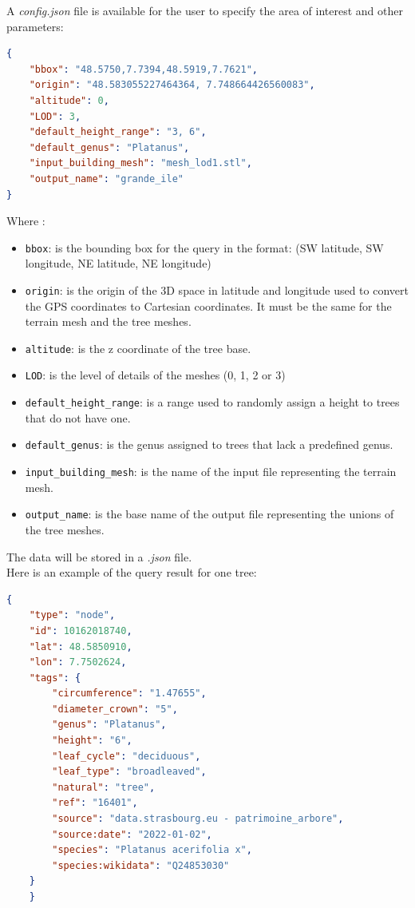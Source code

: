 \documentclass[12pt]{article}
\begin{document}
A \textit{config.json} file is available for the user to specify the area of
interest and other parameters:

\begin{lstlisting}[language=json]
{
    "bbox": "48.5750,7.7394,48.5919,7.7621",
    "origin": "48.583055227464364, 7.748664426560083",
    "altitude": 0,
    "LOD": 3,
    "default_height_range": "3, 6",
    "default_genus": "Platanus",
    "input_building_mesh": "mesh_lod1.stl",
    "output_name": "grande_ile"
}
\end{lstlisting}

Where :
\begin{itemize}
    \item \texttt{bbox}: is the bounding box for the query in the format:
    \subitem (SW latitude, SW longitude, NE latitude, NE longitude)
    \item \texttt{origin}: is the origin of the 3D space in latitude and longitude
    used to convert the GPS coordinates to Cartesian coordinates. It must be the
    same for the terrain mesh and the tree meshes.
    \item \texttt{altitude}: is the z coordinate of the tree base.
    \item \texttt{LOD}: is the level of details of the meshes (0, 1, 2 or 3)
    \item \texttt{default\_height\_range}: is a range used to randomly assign a
    height to trees that do not have one.
    \item \texttt{default\_genus}: is the genus assigned to trees that lack a
    predefined genus.
    \item \texttt{input\_building\_mesh}: is the name of the input file
    representing the terrain mesh.
    \item \texttt{output\_name}: is the base name of the output file
    representing the unions of the tree meshes.
\end{itemize}

The data will be stored in a \textit{.json} file. \\
Here is an example of the query result for one tree:

\begin{lstlisting}[language=json]
{
    "type": "node",
    "id": 10162018740,
    "lat": 48.5850910,
    "lon": 7.7502624,
    "tags": {
        "circumference": "1.47655",
        "diameter_crown": "5",
        "genus": "Platanus",
        "height": "6",
        "leaf_cycle": "deciduous",
        "leaf_type": "broadleaved",
        "natural": "tree",
        "ref": "16401",
        "source": "data.strasbourg.eu - patrimoine_arbore",
        "source:date": "2022-01-02",
        "species": "Platanus acerifolia x",
        "species:wikidata": "Q24853030"
    }
    }
\end{lstlisting}
\end{document}
